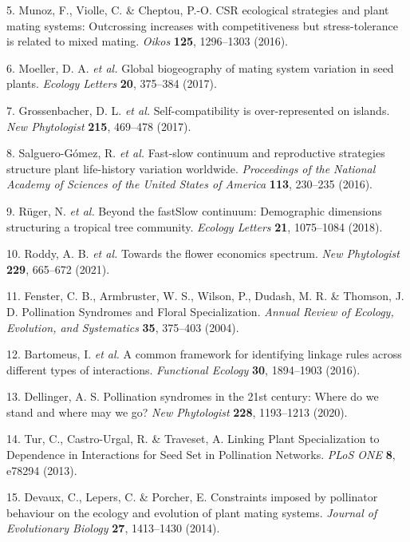 \documentclass[12pt,a4paper,]{article}
\begin{document}
\hypertarget{ref-munoz2016}{}
5. Munoz, F., Violle, C. \& Cheptou, P.-O. CSR ecological strategies and
plant mating systems: Outcrossing increases with competitiveness but
stress-tolerance is related to mixed mating. \emph{Oikos} \textbf{125},
1296--1303 (2016).

\hypertarget{ref-moeller2017}{}
6. Moeller, D. A. \emph{et al.} Global biogeography of mating system
variation in seed plants. \emph{Ecology Letters} \textbf{20}, 375--384
(2017).

\hypertarget{ref-grossenbacher2017}{}
7. Grossenbacher, D. L. \emph{et al.} Self-compatibility is
over-represented on islands. \emph{New Phytologist} \textbf{215},
469--478 (2017).

\hypertarget{ref-salguero2016}{}
8. Salguero-Gómez, R. \emph{et al.} Fast-slow continuum and reproductive
strategies structure plant life-history variation worldwide.
\emph{Proceedings of the National Academy of Sciences of the United
States of America} \textbf{113}, 230--235 (2016).

\hypertarget{ref-ruger2018}{}
9. Rüger, N. \emph{et al.} Beyond the fastSlow continuum: Demographic
dimensions structuring a tropical tree community. \emph{Ecology Letters}
\textbf{21}, 1075--1084 (2018).

\hypertarget{ref-roddy2021}{}
10. Roddy, A. B. \emph{et al.} Towards the flower economics spectrum.
\emph{New Phytologist} \textbf{229}, 665--672 (2021).

\hypertarget{ref-fenster2004}{}
11. Fenster, C. B., Armbruster, W. S., Wilson, P., Dudash, M. R. \&
Thomson, J. D. Pollination Syndromes and Floral Specialization.
\emph{Annual Review of Ecology, Evolution, and Systematics} \textbf{35},
375--403 (2004).

\hypertarget{ref-bartomeus2016}{}
12. Bartomeus, I. \emph{et al.} A common framework for identifying
linkage rules across different types of interactions. \emph{Functional
Ecology} \textbf{30}, 1894--1903 (2016).

\hypertarget{ref-dellinger2020}{}
13. Dellinger, A. S. Pollination syndromes in the 21st century: Where do
we stand and where may we go? \emph{New Phytologist} \textbf{228},
1193--1213 (2020).

\hypertarget{ref-tur2013}{}
14. Tur, C., Castro-Urgal, R. \& Traveset, A. Linking Plant
Specialization to Dependence in Interactions for Seed Set in Pollination
Networks. \emph{PLoS ONE} \textbf{8}, e78294 (2013).

\hypertarget{ref-devaux2014}{}
15. Devaux, C., Lepers, C. \& Porcher, E. Constraints imposed by
pollinator behaviour on the ecology and evolution of plant mating
systems. \emph{Journal of Evolutionary Biology} \textbf{27}, 1413--1430
(2014).
\end{document}
